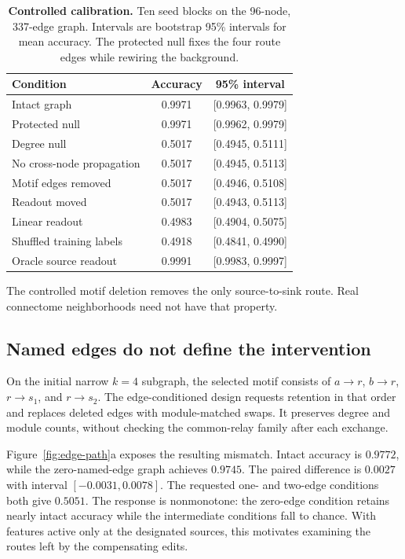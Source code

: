 \begin{table}[t]
\centering
\caption{\textbf{Controlled calibration.} Ten seed blocks on the
96-node, 337-edge graph. Intervals are bootstrap 95\% intervals for mean
accuracy. The protected null fixes the four route edges while rewiring
the background.}
\label{tab:calibration}
\small
\begin{tabular}{lcc}
\toprule
Condition & Accuracy & 95\% interval \\
\midrule
Intact graph & 0.9971 & [0.9963, 0.9979] \\
Protected null & 0.9971 & [0.9962, 0.9979] \\
Degree null & 0.5017 & [0.4945, 0.5111] \\
No cross-node propagation & 0.5017 & [0.4945, 0.5113] \\
Motif edges removed & 0.5017 & [0.4946, 0.5108] \\
Readout moved & 0.5017 & [0.4943, 0.5113] \\
Linear readout & 0.4983 & [0.4904, 0.5075] \\
Shuffled training labels & 0.4918 & [0.4841, 0.4990] \\
Oracle source readout & 0.9991 & [0.9983, 0.9997] \\
\bottomrule
\end{tabular}
\end{table}

The controlled motif deletion removes the only source-to-sink route.
Real connectome neighborhoods need not have that property.

\subsection{Named edges do not define the intervention}
\label{sec:edge}

On the initial narrow $k=4$ subgraph, the selected motif consists of
$a\!\to\!r$, $b\!\to\!r$, $r\!\to\!s_1$, and
$r\!\to\!s_2$. The edge-conditioned design requests retention in that
order and replaces deleted edges with module-matched swaps. It preserves
degree and module counts, without checking the common-relay family after
each exchange.

Figure~\ref{fig:edge-path}a exposes the resulting mismatch. Intact accuracy
is $0.9772$, while the zero-named-edge graph achieves $0.9745$.
The paired difference is $0.0027$ with interval $[-0.0031,0.0078]$.
The requested one- and two-edge conditions both give $0.5051$.
The response is nonmonotone: the zero-edge condition retains nearly
intact accuracy while the intermediate conditions fall to chance. With
features active only at the designated sources, this motivates examining
the routes left by the compensating edits.

